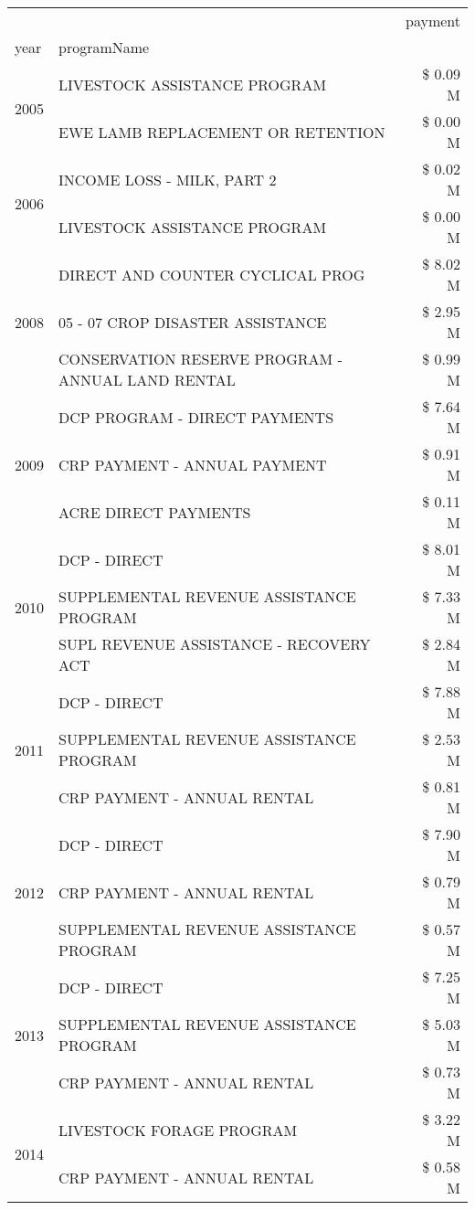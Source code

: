 \begin{tabular}{llr}
\toprule
 &  & payment \\
year & programName &  \\
\midrule
\multirow[t]{2}{*}{2005} & LIVESTOCK ASSISTANCE PROGRAM & \$ 0.09 M \\
 & EWE LAMB REPLACEMENT OR RETENTION & \$ 0.00 M \\
\cline{1-3}
\multirow[t]{2}{*}{2006} & INCOME LOSS - MILK, PART 2 & \$ 0.02 M \\
 & LIVESTOCK ASSISTANCE PROGRAM & \$ 0.00 M \\
\cline{1-3}
\multirow[t]{3}{*}{2008} & DIRECT AND COUNTER CYCLICAL PROG & \$ 8.02 M \\
 & 05 - 07 CROP DISASTER ASSISTANCE & \$ 2.95 M \\
 & CONSERVATION RESERVE PROGRAM - ANNUAL LAND RENTAL & \$ 0.99 M \\
\cline{1-3}
\multirow[t]{3}{*}{2009} & DCP PROGRAM - DIRECT PAYMENTS & \$ 7.64 M \\
 & CRP PAYMENT - ANNUAL PAYMENT & \$ 0.91 M \\
 & ACRE DIRECT PAYMENTS & \$ 0.11 M \\
\cline{1-3}
\multirow[t]{3}{*}{2010} & DCP - DIRECT & \$ 8.01 M \\
 & SUPPLEMENTAL REVENUE ASSISTANCE PROGRAM & \$ 7.33 M \\
 & SUPL REVENUE ASSISTANCE - RECOVERY ACT & \$ 2.84 M \\
\cline{1-3}
\multirow[t]{3}{*}{2011} & DCP - DIRECT & \$ 7.88 M \\
 & SUPPLEMENTAL REVENUE ASSISTANCE PROGRAM & \$ 2.53 M \\
 & CRP PAYMENT - ANNUAL RENTAL & \$ 0.81 M \\
\cline{1-3}
\multirow[t]{3}{*}{2012} & DCP - DIRECT & \$ 7.90 M \\
 & CRP PAYMENT - ANNUAL RENTAL & \$ 0.79 M \\
 & SUPPLEMENTAL REVENUE ASSISTANCE PROGRAM & \$ 0.57 M \\
\cline{1-3}
\multirow[t]{3}{*}{2013} & DCP - DIRECT & \$ 7.25 M \\
 & SUPPLEMENTAL REVENUE ASSISTANCE PROGRAM & \$ 5.03 M \\
 & CRP PAYMENT - ANNUAL RENTAL & \$ 0.73 M \\
\cline{1-3}
\multirow[t]{3}{*}{2014} & LIVESTOCK FORAGE PROGRAM & \$ 3.22 M \\
 & CRP PAYMENT - ANNUAL RENTAL & \$ 0.58 M \\

\end{tabular}
